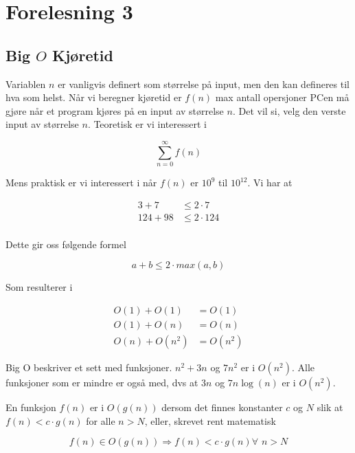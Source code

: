\documentclass{article}
\begin{document}
   \section{Forelesning 3} 

   \subsection{Big \( O \) Kjøretid}
   Variablen \( n \) er vanligvis definert som størrelse på input, men den kan defineres til hva som helst. Når vi beregner kjøretid er \( f\left( n \right) \) max antall opersjoner PCen må gjøre når et program kjøres på en input av størrelse \( n \). Det vil si, velg den verste input av størrelse \( n \). Teoretisk er vi interessert i 

   \[ \sum_{n=0}^{\infty} f\left( n \right) \]

Mens praktisk er vi interessert i når \( f\left( n \right) \) er \( 10^{9} \) til \( 10^{12} \). Vi har at

\begin{align*}
    3 + 7 &\leq 2 \cdot  7 \\
    124 + 98 &\leq 2 \cdot  124 \\
\end{align*}

Dette gir oss følgende formel

\[ a + b \leq 2 \cdot  max(a, b) \]

Som resulterer i

\begin{align*}
    O\left( 1 \right) + O\left( 1 \right) &= O\left( 1 \right) \\
    O\left( 1 \right)+O\left( n \right) &= O\left( n \right) \\
    O\left( n \right) + O\left( n^2 \right) &= O\left( n^2 \right)
\end{align*}

Big O beskriver et sett med funksjoner. \( n^2+3n \) og \( 7n^2 \) er i \( O\left( n^2 \right) \). Alle funksjoner som er mindre er også med, dvs at \( 3n \) og \( 7n \log\left( n \right) \) er i \( O\left( n^2 \right) \).

\begin{definition}
    En funksjon \( f\left( n \right) \) er i \( O\left( g\left( n \right) \right) \) dersom det finnes konstanter \( c \) og \( N \) slik at \( f\left( n \right) < c \cdot  g\left( n \right) \) for alle \( n > N \), eller, skrevet rent matematisk

    \[ f\left( n \right) \in O\left( g\left( n \right) \right) \Rightarrow f\left( n \right) < c \cdot  g\left( n \right) \forall \phantom{i} n > N\]

\end{definition}
\end{document}
